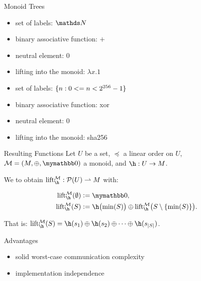\documentclass{beamer}
\begin{document}
\begin{frame}{Monoid Trees}
    \begin{itemize}
        \item set of labels: $\N$
        \item binary associative function: $+$
        \item neutral element: $0$\pause\pause
        \item lifting into the monoid: $\lambda x.1$
    \end{itemize}
    \vfill
    \begin{itemize}
        \item<4-> set of labels: $\{n : 0 <= n < 2^{256} - 1\}$
        \item<5-> binary associative function: xor
        \item<5-> neutral element: $0$
        \item<4-> lifting into the monoid: sha256
    \end{itemize}
\end{frame}

\begin{frame}{Resulting Functions}
    Let $U$ be a set, $\preceq$ a linear order on $U$, $\mathcal{M} = (M, \groupaddsym, \neutraladd)$ a monoid, and $\fun{\h}{U}{M}$.

    We  to obtain $\partialfun{\lift{\h}{\mathcal{M}}}{\powerset{U}}{M}$ with:

    \begin{align*}
    \lift{\h}{\mathcal{M}}(\emptyset) &\defeq \neutraladd,\\
    \lift{\h}{\mathcal{M}}(S) &\defeq \h\bigl(\min(S)\bigr) \oplus \lift{\h}{\mathcal{M}}\bigl(S \setminus \set{\min(S)}\bigr).\\
    \end{align*}

    That is: $\lift{\h}{\mathcal{M}}(S) = \groupadd{\h(s_1)}{\groupadd{\h(s_2)}{\groupadd{\cdots}{\h(s_{\abs{S}})}}}$.
\end{frame}

\begin{frame}{Advantages}
    \begin{itemize}
        \item solid worst-case communication complexity
        \item implementation independence
    \end{itemize}
\end{frame}
\end{document}
